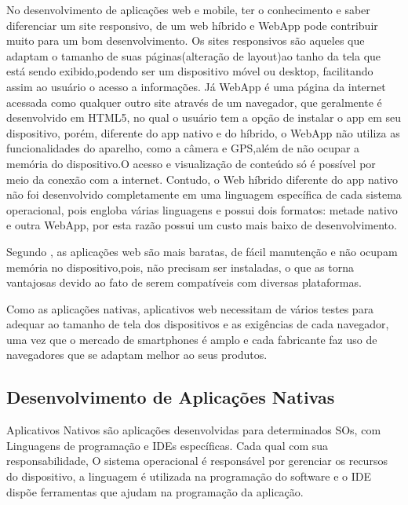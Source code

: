  No desenvolvimento de aplicações web e mobile, ter o conhecimento e saber diferenciar um site responsivo, de um web híbrido e WebApp pode contribuir muito para um bom desenvolvimento. Os sites responsivos são aqueles que adaptam o tamanho de suas páginas(alteração de layout)ao tanho da tela que está sendo exibido,podendo ser um dispositivo móvel ou desktop, facilitando assim ao usuário o acesso a informações. Já WebApp é uma página da internet acessada como qualquer outro site através de um navegador, que geralmente é desenvolvido em HTML5, no qual o usuário tem a opção de instalar o app em seu dispositivo, porém, diferente do app nativo e do híbrido, o WebApp não utiliza as funcionalidades do aparelho, como a câmera e GPS,além de não ocupar a memória do dispositivo.O acesso e visualização de conteúdo só é possível por meio da conexão com a internet. Contudo, o Web híbrido diferente do app nativo não foi desenvolvido completamente em uma linguagem específica de cada sistema operacional, pois engloba várias linguagens e possui dois formatos: metade nativo e  outra WebApp, por esta razão possui um custo mais baixo de desenvolvimento.
 
Segundo , as aplicações web são mais baratas, de fácil manutenção e não ocupam memória no dispositivo,pois, não precisam ser instaladas, o que as torna vantajosas devido ao fato de serem compatíveis com diversas plataformas.


Como as aplicações nativas, aplicativos web necessitam de vários testes para adequar ao tamanho de tela dos dispositivos e as exigências de cada navegador, uma vez que o mercado de smartphones é amplo e cada fabricante faz uso de navegadores que se adaptam melhor ao seus produtos.


\subsection{Desenvolvimento de Aplicações Nativas}

Aplicativos Nativos são aplicações desenvolvidas para determinados SOs, com Linguagens de programação e IDEs específicas. Cada qual com sua responsabilidade, O sistema operacional é responsável por gerenciar os recursos do dispositivo, a linguagem é utilizada na programação do software e o IDE dispõe ferramentas que ajudam na programação da aplicação.


